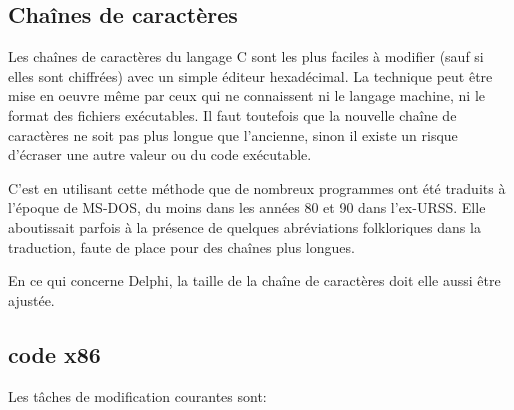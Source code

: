 ﻿

\subsection{Chaînes de caractères}

Les chaînes de caractères du langage C sont les plus faciles à modifier (sauf si elles sont chiffrées)
avec un simple éditeur hexadécimal. La technique peut être mise en oeuvre même par ceux qui ne
connaissent ni le langage machine, ni le format des fichiers exécutables.
Il faut toutefois que la nouvelle chaîne de caractères ne soit pas plus longue que l'ancienne, sinon
il existe un risque d'écraser une autre valeur ou du code exécutable.


C'est en utilisant cette méthode que de nombreux programmes ont été traduits à l'époque de MS-DOS,
du moins dans les années 80 et 90 dans l'ex-URSS. Elle aboutissait parfois à la présence de quelques abréviations folkloriques dans la traduction, faute de place pour des chaînes plus longues.


En ce qui concerne Delphi, la taille de la chaîne de caractères doit elle aussi être ajustée.

\subsection{code x86}
\label{x86_patching}

Les tâches de modification courantes sont:

